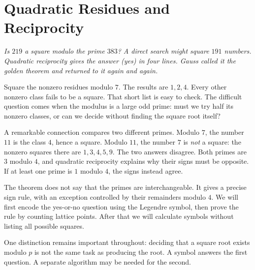 \chapter{Quadratic Residues and Reciprocity}\label{ch:reciprocity}

\begin{center}\itshape
Is $219$ a square modulo the prime $383$? A direct search might square $191$ numbers.\\
Quadratic reciprocity gives the answer (yes) in four lines. Gauss called it the \emph{golden theorem} and returned to it again and again.
\end{center}


Square the nonzero residues modulo $7$. The results are $1,2,4$. Every other nonzero class fails to be a square. That short list is easy to check. The difficult question comes when the modulus is a large odd prime: must we try half its nonzero classes, or can we decide without finding the square root itself?

A remarkable connection compares two different primes. Modulo $7$, the number $11$ is the class $4$, hence a square. Modulo $11$, the number $7$ is \emph{not} a square: the nonzero squares there are $1,3,4,5,9$. The two answers disagree. Both primes are $3$ modulo $4$, and quadratic reciprocity explains why their signs must be opposite. If at least one prime is $1$ modulo $4$, the signs instead agree.

The theorem does not say that the primes are interchangeable. It gives a precise sign rule, with an exception controlled by their remainders modulo $4$. We will first encode the yes-or-no question using the Legendre symbol, then prove the rule by counting lattice points. After that we will calculate symbols without listing all possible squares.

One distinction remains important throughout: deciding that a square root exists modulo $p$ is not the same task as producing the root. A symbol answers the first question. A separate algorithm may be needed for the second.



